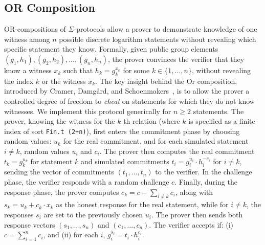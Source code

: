 \documentclass[sigconf,anonymous,review]{acmart}
\begin{document}
\subsection{OR Composition}
OR-compositions of $\Sigma$-protocols allow a prover to demonstrate knowledge of one witness among $n$ possible discrete logarithm statements 
without revealing which specific statement they know. Formally, given public group elements $(g_1, h_1), (g_2, h_2), \ldots, (g_n, h_n)$, 
the prover convinces the verifier that they know a witness $x_k$ such that $h_k = g_k^{x_k}$ for some $k \in \{1, \ldots, n\}$, 
without revealing the index $k$ or the witness $x_k$. The key insight behind the Or composition, introduced by Cramer, Damg\aa rd, and Schoenmakers~\cite{cramer1994proofs}, 
is to allow the prover a controlled degree of freedom to \emph{cheat} on statements for which they do not know witnesses.  We implement this protocol generically for $n \geq 2$ statements. The prover, knowing the witness for the $k$-th relation (where $k$ is specified as a finite index of sort \texttt{Fin.t (2+n)}), first enters the commitment phase by choosing random values: $u_k$ for the real commitment, and for each simulated statement $i \neq k$, random values $u_i$ and $c_i$. The prover then computes the real commitment $t_k = g_k^{u_k}$ for statement $k$ and simulated commitments $t_i = g_i^{u_i} \cdot h_i^{-c_i}$ for $i \neq k$, sending the vector of commitments $(t_1, \ldots, t_n)$ to the verifier. In the challenge phase, the verifier responds with a random challenge $c$. Finally, during the response phase, the prover computes $c_k = c - \sum_{i \neq k} c_i$, along with $s_k = u_k + c_k \cdot x_k$ as the honest response for the real statement, while for $i \neq k$, the responses $s_i$ are set to the previously chosen $u_i$. The prover then sends both response vectors $(s_1, \ldots, s_n)$ and $(c_1, \ldots, c_n)$. The verifier accepts if: (i) $c = \sum_{i=1}^{n} c_i$, and (ii) for each $i$, $g_i^{s_i} = t_i \cdot h_i^{c_i}$.
\end{document}
